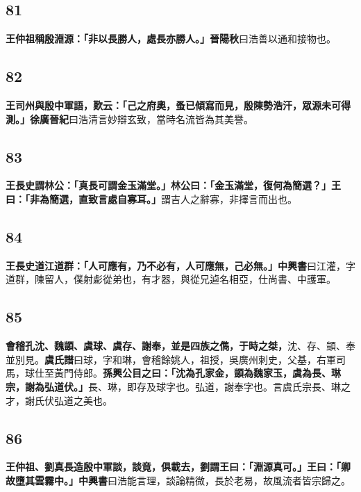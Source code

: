 \subsection*{81}

\textbf{王仲祖稱殷淵源：「非以長勝人，處長亦勝人。」}{\footnotesize \textbf{晉陽秋}曰浩善以通和接物也。}

\subsection*{82}

\textbf{王司州與殷中軍語，歎云：「己之府奧，蚤已傾寫而見，殷陳勢浩汗，眾源未可得測。」}{\footnotesize \textbf{徐廣晉紀}曰浩清言妙辯玄致，當時名流皆為其美譽。}

\subsection*{83}

\textbf{王長史謂林公：「真長可謂金玉滿堂。」林公曰：「金玉滿堂，復何為簡選？」王曰：「非為簡選，直致言處自寡耳。」}{\footnotesize 謂吉人之辭寡，非擇言而出也。}

\subsection*{84}

\textbf{王長史道江道群：「人可應有，乃不必有，人可應無，己必無。」}{\footnotesize \textbf{中興書}曰江灌，字道群，陳留人，僕射虨從弟也，有才器，與從兄逌名相亞，仕尚書、中護軍。}

\subsection*{85}

\textbf{會稽孔沈、魏顗、虞球、虞存、謝奉，並是四族之儁，于時之桀，}{\footnotesize 沈、存、顗、奉並別見。\textbf{虞氏譜}曰球，字和琳，會稽餘姚人，祖授，吳廣州刺史，父基，右軍司馬，球仕至黃門侍郎。}\textbf{孫興公目之曰：「沈為孔家金，顗為魏家玉，虞為長、琳宗，謝為弘道伏。」}{\footnotesize 長、琳，即存及球字也。弘道，謝奉字也。言虞氏宗長、琳之才，謝氏伏弘道之美也。}

\subsection*{86}

\textbf{王仲祖、劉真長造殷中軍談，談竟，俱載去，劉謂王曰：「淵源真可。」王曰：「卿故墮其雲霧中。」}{\footnotesize \textbf{中興書}曰浩能言理，談論精微，長於老易，故風流者皆宗歸之。}

